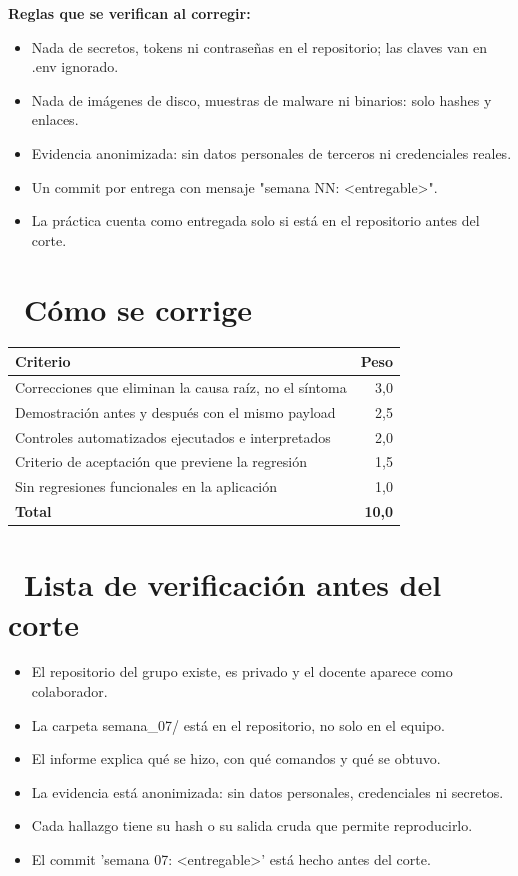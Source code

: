 \documentclass[11pt,a4paper]{article}
\newcommand{\iconotexto}[2]{\textcolor{cyanNeon}{\faIcon{#1}}~#2}
\begin{document}
\textbf{Reglas que se verifican al corregir:}

\begin{itemize}[leftmargin=1.4em,itemsep=2pt,topsep=3pt]
  \item Nada de secretos, tokens ni contraseñas en el repositorio; las claves van en .env ignorado.
  \item Nada de imágenes de disco, muestras de malware ni binarios: solo hashes y enlaces.
  \item Evidencia anonimizada: sin datos personales de terceros ni credenciales reales.
  \item Un commit por entrega con mensaje "semana NN: \textless{}entregable\textgreater{}".
  \item La práctica cuenta como entregada solo si está en el repositorio antes del corte.
\end{itemize}

\section{\iconotexto{ruler-combined}{Cómo se corrige}}

\begin{tabularx}{\linewidth}{@{}X r@{}}
\toprule
Criterio & Peso\\
\midrule
Correcciones que eliminan la causa raíz, no el síntoma & 3,0 \\
Demostración antes y después con el mismo payload & 2,5 \\
Controles automatizados ejecutados e interpretados & 2,0 \\
Criterio de aceptación que previene la regresión & 1,5 \\
Sin regresiones funcionales en la aplicación & 1,0 \\
\midrule
\textbf{Total} & \textbf{10,0}\\
\bottomrule
\end{tabularx}

\section{\iconotexto{clipboard-check}{Lista de verificación antes del corte}}

\begin{itemize}[leftmargin=1.4em,itemsep=2pt,topsep=3pt]
  \item El repositorio del grupo existe, es privado y el docente aparece como colaborador.
  \item La carpeta semana\_07/ está en el repositorio, no solo en el equipo.
  \item El informe explica qué se hizo, con qué comandos y qué se obtuvo.
  \item La evidencia está anonimizada: sin datos personales, credenciales ni secretos.
  \item Cada hallazgo tiene su hash o su salida cruda que permite reproducirlo.
  \item El commit 'semana 07: \textless{}entregable\textgreater{}' está hecho antes del corte.
\end{itemize}
\end{document}
